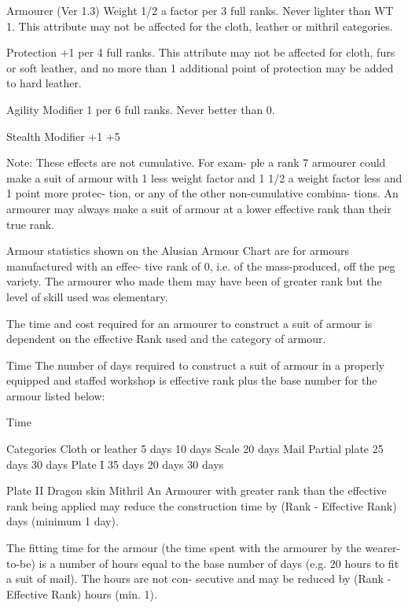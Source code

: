 \begin{Chapter}{Armourer (Ver 1.3)}
Weight 1/2 a factor per 3 full ranks. Never lighter 
than  WT  1.  This  attribute  may  not  be  affected  for 
the cloth, leather or mithril categories. 

Protection  +1 per  4  full  ranks.  This attribute  may 
not be affected for cloth, furs or soft leather, and no 
more  than  1 additional  point  of  protection  may  be 
added to hard leather. 

Agility  Modifier  1  per  6  full  ranks.  Never  better 
than 0. 

Stealth Modifier +1%
+5%

Note: These effects are not cumulative. For exam-
ple a rank 7 armourer could make a suit of armour 
with  1  less weight  factor  and  1%
1/2  a  weight  factor  less  and  1  point  more  protec-
tion,  or  any  of  the  other  non-cumulative  combina-
tions.  An  armourer  may  always  make  a  suit  of 
armour  at  a  lower  effective  rank  than  their  true 
rank. 

Armour  statistics  shown  on  the  Alusian  Armour 
Chart are for armours manufactured with an effec-
tive  rank  of  0,  i.e.  of  the  mass-produced,  off  the 
peg  variety.  The  armourer  who  made  them  may 
have been of greater rank but the level of skill used 
was elementary. 

The  time  and  cost  required  for an  armourer  to 
construct  a  suit  of  armour  is  dependent  on  the 
effective Rank used and the category of armour. 

Time  The  number  of  days  required  to  construct  a 
suit  of  armour  in  a  properly  equipped  and  staffed 
workshop  is  effective  rank  plus  the  base  number 
for the armour listed below: 

Time 

Categories 
Cloth or leather   5 days  
10 days  
Scale  
20 days  
Mail  
Partial plate  
25 days  
30 days  
Plate I  
35 days  
20 days  
30 days 

Plate II  
Dragon skin  
Mithril  
An  Armourer  with  greater  rank  than  the  effective 
rank  being  applied  may  reduce  the  construction 
time by (Rank - Effective Rank) days (minimum 1 
day).  

The fitting time for the armour (the time spent with 
the  armourer  by  the  wearer-to-be)  is  a  number  of 
hours  equal  to  the  base  number  of  days  (e.g.  20 
hours to fit a suit of mail). The hours are not con-
secutive and may be reduced by (Rank  - Effective 
Rank) hours (min. 1).  


\end{Chapter}
